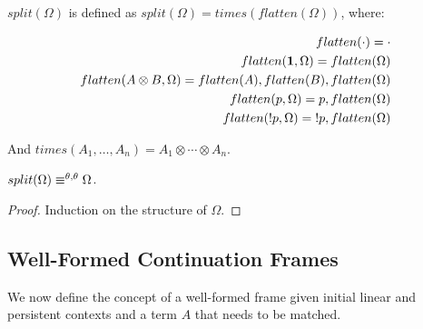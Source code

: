 \begin{definition}
$split(\Omega)$ is defined as $split(\Omega) = times(flatten(\Omega))$, where:

\begin{align}
flatten(\cdot) = \cdot \\
flatten(\mathbf{1}, \Omega) = flatten(\Omega) \\
flatten(A \otimes B, \Omega) = flatten(A), flatten(B), flatten(\Omega) \\
flatten(p, \Omega) = p, flatten(\Omega) \\
flatten({!} p, \Omega) = {!} p, flatten(\Omega)
\end{align}

And $times(A_1, \dotsc, A_n) = A_1 \otimes \dotsb \otimes A_n$.
\end{definition}

\begin{theorem}
$split(\Omega) \equiv^{\theta, \theta} \Omega$.
\end{theorem}
\begin{proof}
Induction on the structure of $\Omega$.
\end{proof}

\subsection{Well-Formed Continuation Frames}

We now define the concept of a well-formed frame given initial linear and
persistent contexts and a term $A$ that needs to be matched.

